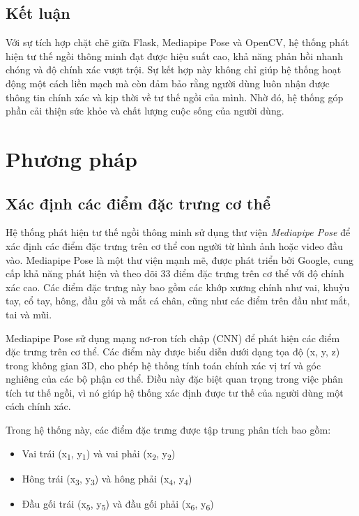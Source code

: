 \documentclass[conference]{IEEEtran}
\begin{document}
\subsection{Kết luận}
Với sự tích hợp chặt chẽ giữa Flask, Mediapipe Pose và OpenCV, hệ thống phát hiện tư thế ngồi thông minh đạt được hiệu suất cao, khả năng phản hồi nhanh chóng và độ chính xác vượt trội. Sự kết hợp này không chỉ giúp hệ thống hoạt động một cách liền mạch mà còn đảm bảo rằng người dùng luôn nhận được thông tin chính xác và kịp thời về tư thế ngồi của mình. Nhờ đó, hệ thống góp phần cải thiện sức khỏe và chất lượng cuộc sống của người dùng.


\section{Phương pháp}
\subsection{Xác định các điểm đặc trưng cơ thể}
Hệ thống phát hiện tư thế ngồi thông minh sử dụng thư viện \textit{Mediapipe Pose} để xác định các điểm đặc trưng trên cơ thể con người từ hình ảnh hoặc video đầu vào. Mediapipe Pose là một thư viện mạnh mẽ, được phát triển bởi Google, cung cấp khả năng phát hiện và theo dõi 33 điểm đặc trưng trên cơ thể với độ chính xác cao. Các điểm đặc trưng này bao gồm các khớp xương chính như vai, khuỷu tay, cổ tay, hông, đầu gối và mắt cá chân, cũng như các điểm trên đầu như mắt, tai và mũi.

Mediapipe Pose sử dụng mạng nơ-ron tích chập (CNN) để phát hiện các điểm đặc trưng trên cơ thể. Các điểm này được biểu diễn dưới dạng tọa độ (x, y, z) trong không gian 3D, cho phép hệ thống tính toán chính xác vị trí và góc nghiêng của các bộ phận cơ thể. Điều này đặc biệt quan trọng trong việc phân tích tư thế ngồi, vì nó giúp hệ thống xác định được tư thế của người dùng một cách chính xác.

Trong hệ thống này, các điểm đặc trưng được tập trung phân tích bao gồm:
\begin{itemize}
    \item Vai trái (x\textsubscript{1}, y\textsubscript{1}) và vai phải (x\textsubscript{2}, y\textsubscript{2})
    \item Hông trái (x\textsubscript{3}, y\textsubscript{3}) và hông phải (x\textsubscript{4}, y\textsubscript{4})
    \item Đầu gối trái (x\textsubscript{5}, y\textsubscript{5}) và đầu gối phải (x\textsubscript{6}, y\textsubscript{6})
\end{itemize}
\end{document}
